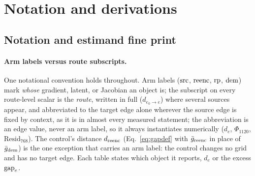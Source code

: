\appendix

\section{Notation and derivations}
\label{app:derivations}

\subsection{Notation and estimand fine print}
\label{app:notation}

\paragraph{Arm labels versus route subscripts.}
One notational convention holds throughout. Arm labels ($\mathrm{src}$,
$\mathrm{reenc}$, $\mathrm{rp}$, $\mathrm{dem}$) mark \emph{whose} gradient, latent, or
Jacobian an object is; the subscript on every route-level scalar is the
\emph{route}, written in full ($d_{e_0 \to e}$) where several sources
appear, and abbreviated to the target edge alone wherever the source
edge is fixed by context, as it is in almost every measured
statement; the abbreviation is an edge value, never an arm label, so
it always instantiates numerically ($d_e$, $\Phi_{1120}$,
$\mathrm{Resid}_{768}$). The
control's distance $d_{\mathrm{reenc}}$ (Eq.~\ref{eq:gapdef} with
$\bar g_{\mathrm{reenc}}$ in place of $\bar g_{\mathrm{dem}}$) is the one exception that
carries an arm label: the control changes no grid and has no target
edge. Each table states which object it reports, $d_e$ or the excess
$\mathrm{gap}_e$.

